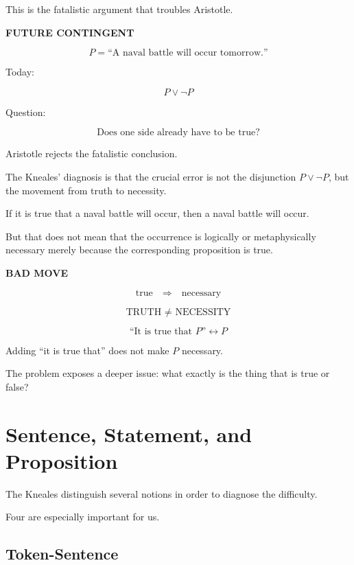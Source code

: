\documentclass[11pt]{article}
\begin{document}
This is the fatalistic argument that troubles Aristotle.

\begin{whiteboard}
\textbf{FUTURE CONTINGENT}

\[
P =
\text{``A naval battle will occur tomorrow.''}
\]

Today:

\[
P\lor\neg P
\]

Question:

\[
\text{Does one side already have to be true?}
\]
\end{whiteboard}

Aristotle rejects the fatalistic conclusion.

The Kneales' diagnosis is that the crucial error is not the
disjunction \(P\lor\neg P\), but the movement from truth to
necessity.

If it is true that a naval battle will occur, then a naval battle
will occur.

But that does not mean that the occurrence is logically or
metaphysically necessary merely because the corresponding
proposition is true.

\begin{whiteboard}
\textbf{BAD MOVE}

\[
\text{true}
\quad\Longrightarrow\quad
\text{necessary}
\]

\[
\boxed{\text{TRUTH }\neq\text{ NECESSITY}}
\]

\[
\text{``It is true that }P\text{''}
\leftrightarrow
P
\]

Adding ``it is true that''
does not make \(P\) necessary.
\end{whiteboard}

The problem exposes a deeper issue: what exactly is the thing
that is true or false?

\section{Sentence, Statement, and Proposition}

The Kneales distinguish several notions in order to diagnose the
difficulty.

Four are especially important for us.

\subsection{Token-Sentence}
\end{document}
